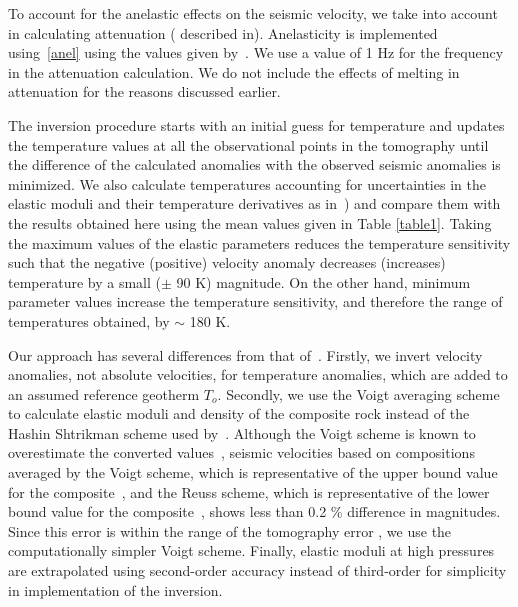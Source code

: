 \documentclass[draft,linenumbers]{agujournal2018}
\begin{document}
To account for the anelastic effects on the seismic velocity, we take into account  in calculating attenuation ( described in\citet{sobolev1996upper}). Anelasticity is implemented using~\ref{anel} using the values given by~\citet{sobolev1996upper}. We use a value of 1 Hz for the frequency in the attenuation calculation. We do not include the effects of melting in attenuation for the reasons discussed earlier.

The inversion procedure starts with an initial guess for temperature and updates the temperature values at all the observational points in the tomography until the difference of the calculated anomalies with the observed seismic anomalies is minimized. We also calculate temperatures accounting for uncertainties in the elastic moduli and their temperature derivatives as in~\citep{Cammarano2003}) and compare them with the results obtained here using the mean values given in Table \ref{table1}. Taking the maximum values of the elastic parameters reduces the temperature sensitivity such that the negative (positive) velocity anomaly decreases (increases) temperature by a small ($\pm$ 90 K) magnitude. On the other hand, minimum parameter values increase the temperature sensitivity, and therefore the range of temperatures obtained, by $\sim$ 180 K.

Our approach has several differences from that of~\citet{Cammarano2003}. Firstly, we invert velocity anomalies, not absolute velocities, for temperature anomalies, which are added to an assumed reference geotherm $T_o$. Secondly, we use the Voigt averaging scheme to calculate elastic moduli and density of the composite rock instead of the Hashin Shtrikman scheme used by~\citet{Cammarano2003}. Although the Voigt scheme is known to overestimate the converted values~\citep{watt_1976}, seismic velocities based on compositions averaged by the Voigt scheme, which is representative of the upper bound value for the composite~\citep{watt_1976}, and the Reuss scheme, which is representative of the  lower bound value for the composite~\citep{watt_1976}, shows less than 0.2 \% difference in magnitudes. Since this error is within the range of the tomography error \citep{Biryol_2016}, we use the computationally simpler Voigt scheme. Finally, elastic moduli at high pressures are extrapolated using second-order accuracy instead of third-order for simplicity in implementation of the inversion.
\end{document}
